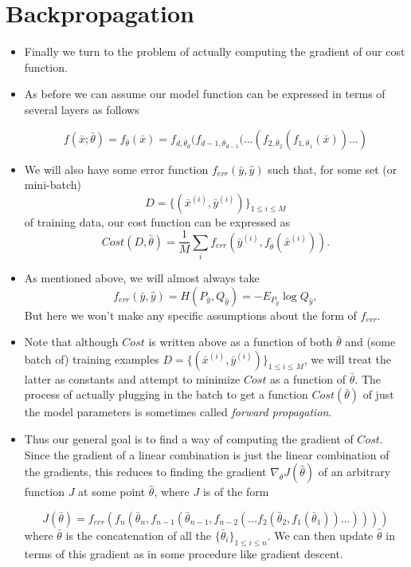 \documentclass{article}
\begin{document}
\section{Backpropagation}
\begin{itemize}

\item Finally we turn to the problem of actually computing the gradient of our cost function.
\item As before we can assume our model function can be expressed in terms of several layers as follows

$$f(\bar{x} ; \bar{\theta}) = f_{\bar{\theta}}(\bar{x}) = f_{d,\bar{\theta}_{d}}(f_{d-1, \bar{\theta}_{d-1} }(\ldots(f_{2, \bar{\theta}_{2}}(f_{1, \bar{\theta}_{1}}(\bar{x}))\ldots)$$
\item We will also have some error function $f_{err}(\bar{y}, \hat{y})$ such that, for some set (or mini-batch)  $$D = \{(\bar{x}^{(i)}, \bar{y}^{(i)})\}_{1\leq i \leq M}$$  of training data, our cost function can be expressed
as $$Cost(D, \bar{\theta}) = \frac{1}{M}\sum_{i}f_{err}(\bar{y}^{(i)}, f_{\bar{\theta}}(\bar{x}^{(i)})).$$

\item As mentioned above, we will almost always take
$$f_{err}(\bar{y}, \hat{y}) = H(P_{\bar{y}}, Q_{\hat{y}}) = - E_{P_{\bar{y}}} \log{Q_{\hat{y}}},$$
But here we won't make any specific assumptions about the form of $f_{err}$.  


\item Note that although $Cost$ is written above as a function of both $\bar{\theta}$ and (some batch of) training examples $D = \{(\bar{x}^{(i)}, \bar{y}^{(i)})\}_{1\leq i \leq M}$, we will treat the latter as constants and  attempt to minimize $Cost$ as a function of $\bar{\theta}$.  The process of actually plugging in the batch to get a function $Cost(\bar{\theta})$ of just the model parameters is sometimes called \emph{forward propagation}.  
\item Thus our general goal is to find a way of computing the gradient of $Cost$.  Since the gradient of a linear combination is just the linear combination of the gradients, this reduces to finding the gradient $\nabla_{\bar{\theta}}J(\hat{\theta})$  of an arbitrary function $J$ at some point $\hat{\theta}$, where $J$ is of the form

$$J(\bar{\theta}) = f_{err}(f_{n}(\bar{\theta}_{n},  f_{n-1}(\bar{\theta}_{n-1}, f_{n-2}(\ldots f_{2}( \bar{\theta}_{2}, f_{1} (\bar{\theta}_{1}))\ldots ))))$$
where $\bar{\theta}$ is the concatenation of all the  $\{\bar{\theta}_{i}\}_{1\leq i \leq n}.$ We can then update $\hat{\theta}$ in terms of this gradient as in some procedure like gradient descent.



\end{itemize}
\end{document}
